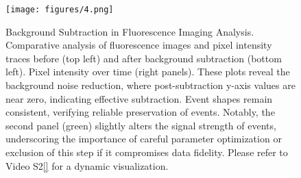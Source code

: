 \begin{figure}[h!]
\begin{center}
\texttt{[image: figures/4.png]}
\end{center}
\caption{Background Subtraction in Fluorescence Imaging Analysis. Comparative analysis of fluorescence images and pixel intensity traces before (top left) and after background subtraction (bottom left). Pixel intensity over time (right panels). These plots reveal the background noise reduction, where post-subtraction y-axis values are near zero, indicating effective subtraction. Event shapes remain consistent, verifying reliable preservation of events. Notably, the second panel (green) slightly alters the signal strength of events, underscoring the importance of careful parameter optimization or exclusion of this step if it compromises data fidelity. Please refer to Video S2\ref{} for a dynamic visualization.}\label{fig:4}
\end{figure}

